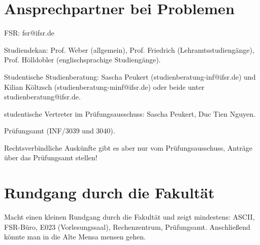 \documentclass[a4paper,12pt]{report}
\begin{document}
\section{Ansprechpartner bei Problemen}
\begin{itemize*}
	\item FSR: fsr@ifsr.de
	\item Studiendekan: Prof. Weber (allgemein), Prof. Friedrich (Lehramtsstudiengänge), Prof. Hölldobler (englischsprachige Studiengänge).
	\item Studentische Studienberatung: Sascha Peukert (studienberatung-inf@ifsr.de) und Kilian Költzsch (studienberatung-minf@ifsr.de) oder beide unter studienberatung@ifsr.de.
	\item studentische Vertreter im Prüfungsausschuss: Sascha Peukert, Duc Tien Nguyen.
	\item Prüfungsamt (INF/3039 und 3040).
	\item Rechtsverbindliche Auskünfte gibt es aber nur vom Prüfungsausschuss, Anträge über das Prüfungsamt stellen!
\end{itemize*}

\section{Rundgang durch die Fakultät}
Macht einen kleinen Rundgang durch die Fakultät und zeigt mindestens: ASCII, FSR-Büro, E023 (Vorlesungssaal), Rechenzentrum, Prüfungsamt.
Anschließend könnte man in die Alte Mensa mensen gehen.
\end{document}
